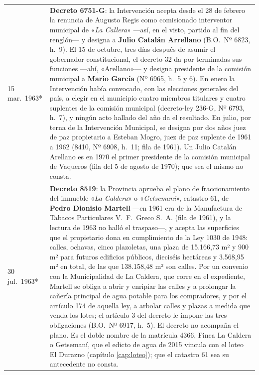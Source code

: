 \begin{longtable}{@{}p{2.7cm}p{10.3cm}@{}}
15 mar.\ 1963* & \textbf{Decreto 6751-G}: la Intervención acepta desde el 28 de febrero la renuncia de Augusto Regis como comisionado interventor municipal de «\textit{La Callera}» ---así, en el visto, partido al fin del renglón--- y designa a \textbf{Julio Catalán Arrellano} (B.O.\ Nº 6823, h.\ 9). El 15 de octubre, tres días después de asumir el gobernador constitucional, el decreto 32 da por terminadas sus funciones ---ahí, «Arellano»--- y designa presidente de la comisión municipal a \textbf{Mario García} (Nº 6965, h.\ 5 y 6). En enero la Intervención había convocado, con las elecciones generales del país, a elegir en el municipio cuatro miembros titulares y cuatro suplentes de la comisión municipal (decreto-ley 236-G, Nº 6793, h.\ 7), y ningún acto hallado del año da el resultado. En julio, por terna de la Intervención Municipal, se designa por dos años juez de paz propietario a Esteban Mogro, juez de paz suplente de 1961 a 1962 (8410, Nº 6908, h.\ 11; fila de 1961). Un Julio Catalán Arellano es en 1970 el primer presidente de la comisión municipal de Vaqueros (fila del 5 de agosto de 1970); que sea el mismo no consta. \\
30 jul.\ 1963* & \textbf{Decreto 8519}: la Provincia aprueba el plano de fraccionamiento del inmueble «\textit{La Caldera}» o «\textit{Getsemani}», catastro 61, de \textbf{Pedro Dionisio Martell} ---en 1961 era de la Manufactura de Tabacos Particulares V.\ F.\ Greco S.\ A. (fila de 1961), y la lectura de 1963 no halló el traspaso---, y acepta las superficies que el propietario dona en cumplimiento de la Ley 1030 de 1948: calles, ochavas, cinco plazoletas, una plaza de 15.166,73 m² y 900 m² para futuros edificios públicos, dieciséis hectáreas y 3.568,95 m² en total, de las que 138.158,48 m² son calles. Por un convenio con la Municipalidad de La Caldera, que corre en el expediente, Martell se obliga a abrir y enripiar las calles y a prolongar la cañería principal de agua potable para los compradores, y por el artículo 174 de aquella ley, a arbolar calles y plazas a medida que venda los lotes; el artículo 3 del decreto le impone las tres obligaciones (B.O.\ Nº 6917, h.\ 5). El decreto no acompaña el plano. Es el doble nombre de la matrícula 4366, Finca La Caldera o Getsemaní, que el edicto de agua de 2015 vincula con el loteo El Durazno (capítulo \ref{cap:loteo}); que el catastro 61 sea su antecedente no consta. \\

\end{longtable}
